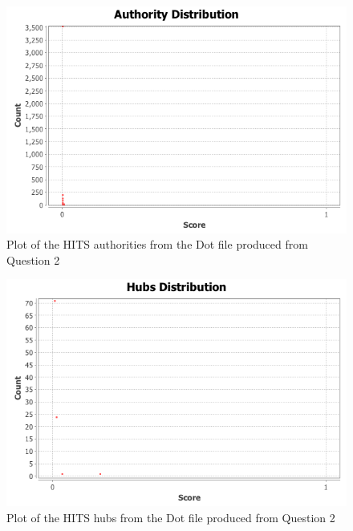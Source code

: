 \documentclass[letterpaper,11pt]{article}
\begin{document}
\begin{figure}[p]
\includegraphics[scale=0.5]{q3/HITS/authorities.png}
\caption{Plot of the HITS authorities from the Dot file produced from Question 2}
\label{fig:q3hits-authorities}
\end{figure}

\begin{figure}[p]
\includegraphics[scale=0.5]{q3/HITS/hubs.png}
\caption{Plot of the HITS hubs from the Dot file produced from Question 2}
\label{fig:q3hits-hubs}
\end{figure}
\end{document}
